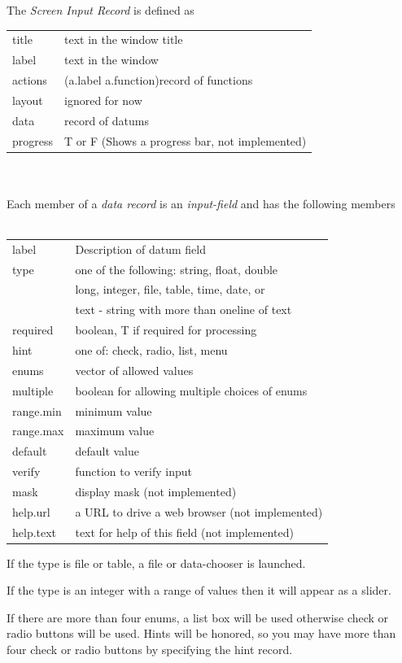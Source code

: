 The \textit{Screen Input Record} is defined as\\
\begin{tabular}{ll}
title & text in the window title\\
label & text in the window\\
actions & (a.label a.function)record of functions\\
layout & ignored for now\\
data & record of datums\\
progress & T or F (Shows a progress bar, not implemented)\\
\end{tabular}
\\\\Each member of a \textit{data record} is an \textit{input-field}  and has
the following members\\\\
\begin{tabular}{ll}
label & Description of datum field\\
type & one of the following: string, float, double\\
     & long, integer, file, table, time, date, or\\
     & text - string with more than oneline of text\\
required & boolean, T if required for processing\\
hint & one of: check, radio, list, menu\\
enums & vector of allowed values\\
multiple & boolean for allowing multiple choices of enums\\
range.min & minimum value\\
range.max & maximum value\\
default & default value\\
verify & function to verify input\\
mask & display mask (not implemented)\\
help.url & a URL to drive a web browser (not implemented)\\
help.text & text for help of this field (not implemented)\\
\end{tabular}

If the type is file or table, a file or data-chooser is launched. 

If the type is an integer with a range of values then it will appear as a
slider. 

If there are more than four enums, a list box will be used otherwise check
or radio buttons will be used.  Hints will be honored, so you may have more
than four check or radio buttons by specifying the hint record.

